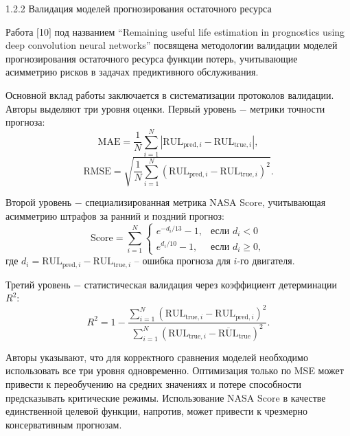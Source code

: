 \documentclass[14pt, a4paper, oneside]{extreport}
\begin{document}
\vspace{1em}
{1.2.2 Валидация моделей прогнозирования остаточного ресурса}
\vspace{1em}

Работа $[$10$]$ под названием “Remaining useful life estimation in prognostics using deep convolution neural networks” посвящена методологии валидации моделей прогнозирования остаточного ресурса функции потерь, учитывающие асимметрию рисков в задачах предиктивного обслуживания.

Основной вклад работы заключается в систематизации протоколов валидации. Авторы выделяют три уровня оценки. Первый уровень $-$ метрики точности прогноза:
\begin{equation}
\text{MAE} = \frac{1}{N} \sum_{i=1}^{N} |\text{RUL}_{\text{pred},i} - \text{RUL}_{\text{true},i}|,
\end{equation}
\begin{equation}
\text{RMSE} = \sqrt{\frac{1}{N} \sum_{i=1}^{N} (\text{RUL}_{\text{pred},i} - \text{RUL}_{\text{true},i})^2}.
\end{equation}

Второй уровень $-$ специализированная метрика NASA Score, учитывающая асимметрию штрафов за ранний и поздний прогноз:
\begin{equation}
\text{Score} = \sum_{i=1}^{N} \begin{cases} 
e^{-d_i/13} - 1, & \text{если } d_i < 0 \\
e^{d_i/10} - 1, & \text{если } d_i \ge 0,
\end{cases}
\end{equation}
где $d_i = \text{RUL}_{\text{pred},i} - \text{RUL}_{\text{true},i}$ -- ошибка прогноза для $i$-го двигателя.

Третий уровень $-$ статистическая валидация через коэффициент детерминации $R^2$:
\begin{equation}
R^2 = 1 - \frac{\sum_{i=1}^{N} (\text{RUL}_{\text{true},i} - \text{RUL}_{\text{pred},i})^2}{\sum_{i=1}^{N} (\text{RUL}_{\text{true},i} - \overline{\text{RUL}}_{\text{true}})^2}.
\end{equation}

Авторы указывают, что для корректного сравнения моделей необходимо использовать все три уровня одновременно. Оптимизация только по MSE может привести к переобучению на средних значениях и потере способности предсказывать критические режимы. Использование NASA Score в качестве единственной целевой функции, напротив, может привести к чрезмерно консервативным прогнозам.
\end{document}

